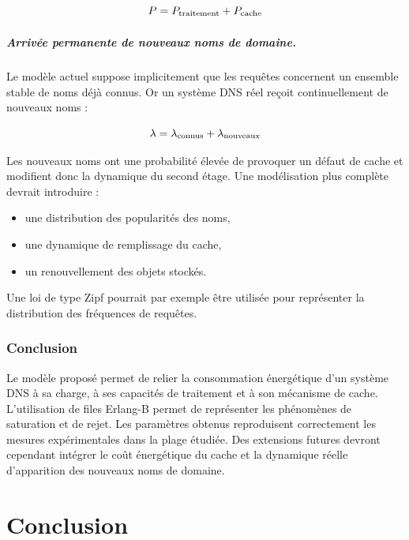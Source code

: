 \documentclass[12pt, a4paper]{report}
\begin{document}
	\[
	P=
	P_{\rm traitement}
	+
	P_{\rm cache}
	\]


	\paragraph{Arrivée permanente de nouveaux noms de domaine.}


	\noindent Le modèle actuel suppose implicitement que les requêtes concernent un
	ensemble stable de noms déjà connus.
	Or un système DNS réel reçoit continuellement de nouveaux noms :

	\[
	\lambda=
	\lambda_{\rm connus}
	+
	\lambda_{\rm nouveaux}
	\]


	\noindent Les nouveaux noms ont une probabilité élevée de provoquer un défaut de
	cache et modifient donc la dynamique du second étage. Une modélisation plus complète devrait introduire :\\

	\begin{itemize}
	\item une distribution des popularités des noms,
	\item une dynamique de remplissage du cache,
	\item un renouvellement des objets stockés.\\
	\end{itemize}


	\noindent Une loi de type Zipf pourrait par exemple être utilisée pour représenter
	la distribution des fréquences de requêtes.


	\subsection{Conclusion}


	Le modèle proposé permet de relier la consommation énergétique d'un
	système DNS à sa charge, à ses capacités de traitement et à son
	mécanisme de cache.
	L'utilisation de files Erlang-B permet de représenter les phénomènes de
	saturation et de rejet.
	Les paramètres obtenus reproduisent correctement les mesures
	expérimentales dans la plage étudiée.
	Des extensions futures devront cependant intégrer le coût énergétique
	du cache et la dynamique réelle d'apparition des nouveaux noms de
	domaine.


	\chapter*{Conclusion}
\end{document}
